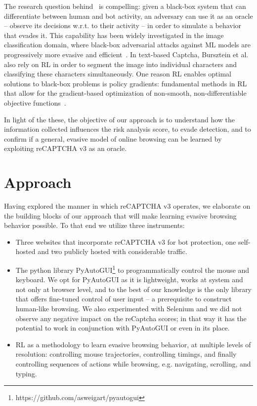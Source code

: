 The research question behind~\cite{akrout2019hacking} is compelling: given a black-box system that can differentiate between human and bot activity, an adversary can use it as an oracle -- observe its decisions w.r.t. to their activity -- in order to simulate a behavior that evades it.
This capability has been widely investigated in the image classification domain, where black-box adversarial attacks against \gls{ML} models are progressively more evasive and efficient~\cite{brendel2017decision, ilyas2018prior}.
In text-based Captcha, Bursztein et al.~\cite{bursztein2014end} also rely on \gls{RL} in order to segment the image into individual characters and classifying these characters simultaneously.
One reason \gls{RL} enables optimal solutions to black-box problems is policy gradients: fundamental methods in \gls{RL} that allow for the gradient-based optimization of non-smooth, non-differentiable objective functions~\cite{sutton1999policy}.

In light of the these, the objective of our approach is to understand how the information collected influences the risk analysis score, to evade detection, and to confirm if a general, evasive model of online browsing can be learned by exploiting reCAPTCHA v3 as an oracle.

\section{Approach}
\label{sec:approachre}

Having explored the manner in which reCAPTCHA v3 operates, we elaborate on the building blocks of our approach that will make learning evasive browsing behavior possible.
To that end we utilize three instruments:
\begin{itemize}
  \item Three websites that incorporate reCAPTCHA v3 for bot protection, one self-hosted and two publicly hosted with considerable traffic.
  \item The python library PyAutoGUI\footnote{https://github.com/asweigart/pyautogui} to programmatically control the mouse and keyboard.
  We opt for PyAutoGUI as it is lightweight, works at system and not only at browser level, and to the best of our knowledge is the only library that offers fine-tuned control of user input -- a prerequisite to construct human-like browsing.
  We also experimented with Selenium and we did not observe any negative impact on the reCaptcha scores; in that way it has the potential to work in conjunction with PyAutoGUI or even in its place.
  \item \gls{RL} as a methodology to learn evasive browsing behavior, at multiple levels of resolution: controlling mouse trajectories, controlling timings, and finally controlling sequences of actions while browsing, e.g. navigating, scrolling, and typing.
\end{itemize}

